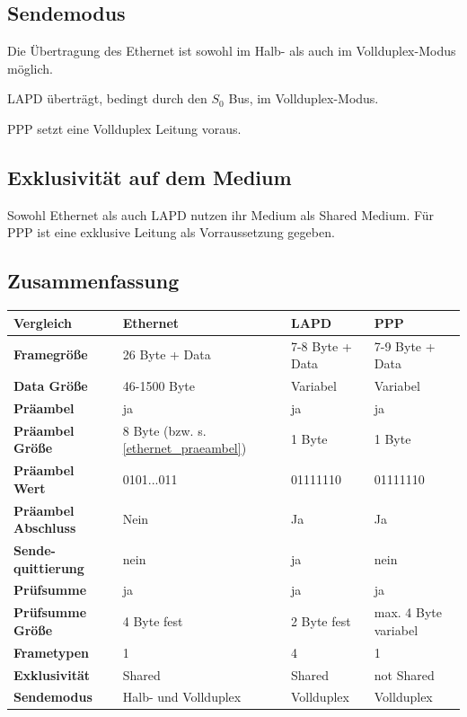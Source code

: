 \documentclass[12pt, a4paper, ngerman]{article}
\begin{document}
\subsection{Sendemodus}
Die Übertragung des Ethernet ist sowohl im Halb- als auch im Vollduplex-Modus möglich. 

LAPD überträgt, bedingt durch den $S_0$ Bus, im Vollduplex-Modus.

PPP setzt eine Vollduplex Leitung voraus.

\subsection{Exklusivität auf dem Medium}
Sowohl Ethernet als auch LAPD nutzen ihr Medium als Shared Medium.
Für PPP ist eine exklusive Leitung als Vorraussetzung gegeben.

\subsection{Zusammenfassung}

\begin{tabular}{| m{\dimexpr.2\linewidth} || m{\dimexpr.2\linewidth} | m{\dimexpr.2\linewidth} | m{\dimexpr.2\linewidth} |}
\hline
\textbf{Vergleich} & \textbf{Ethernet} & \textbf{LAPD} & \textbf{PPP} \\ \hline \hline

\textbf{Framegröße} & 26 Byte + Data & 7-8 Byte + Data & 7-9 Byte + Data \\ \hline

\textbf{Data Größe} & 46-1500 Byte & Variabel & Variabel \\ \hline

\textbf{Präambel} & ja & ja & ja\\ \hline

\textbf{Präambel Größe} & 8 Byte (bzw. s. \ref{ethernet_praeambel})  & 1 Byte & 1 Byte\\ \hline

\textbf{Präambel Wert} & 0101...011  & 01111110 & 01111110\\ \hline

\textbf{Präambel Abschluss} & Nein & Ja & Ja\\ \hline

\textbf{Sende-quittierung} & nein & ja & nein\\ \hline
\textbf{Prüfsumme} & ja & ja & ja\\ \hline

\textbf{Prüfsumme Größe} & 4 Byte fest & 2 Byte fest & max. 4 Byte variabel \\ \hline

\textbf{Frametypen} & 1 & 4 &  1\\ \hline

\textbf{Exklusivität} & Shared & Shared & not Shared\\ \hline

\textbf{Sendemodus} & Halb- und Vollduplex & Vollduplex & Vollduplex \\ \hline
\end{tabular}


   
\nocite{*} 

\newpage
\sloppy
\printbibliography 



\newpage
\listoffigures
\end{document}
